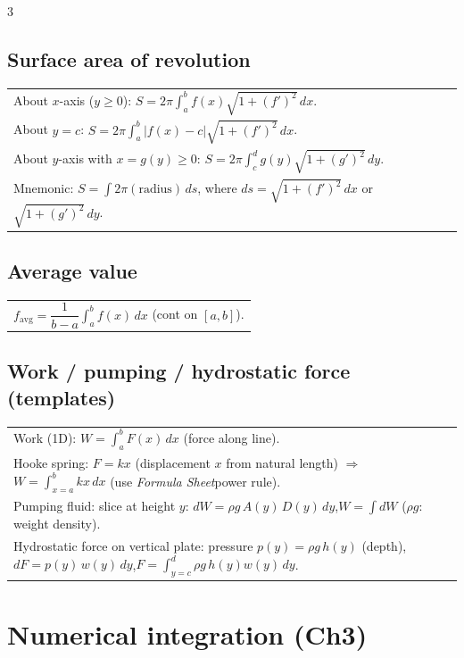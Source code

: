 \documentclass[10pt]{article}
\newcommand{\FS}{\textit{Formula Sheet}}
\begin{document}
\begin{multicols}{3}
\subsection*{Surface area of revolution}
\vspace{-1pt}
\begin{tabular}{@{}p{}@{}}
About $x$-axis ($y\ge 0$): $\displaystyle S=2\pi\int_a^b f(x)\sqrt{1+(f')^2}\,dx$.\\
About $y=c$: $\displaystyle S=2\pi\int_a^b |f(x)-c|\sqrt{1+(f')^2}\,dx$.\\
About $y$-axis with $x=g(y)\ge 0$: $\displaystyle S=2\pi\int_c^d g(y)\sqrt{1+(g')^2}\,dy$.\\
Mnemonic: $S=\int 2\pi(\text{radius})\,ds$, where $ds=\sqrt{1+(f')^2}\,dx$ or $\sqrt{1+(g')^2}\,dy$.\\
\end{tabular}

\subsection*{Average value}
\vspace{-1pt}
\begin{tabular}{@{}p{}@{}}
$f_{\text{avg}}=\dfrac{1}{b-a}\int_a^b f(x)\,dx$ (cont on $[a,b]$).\\
\end{tabular}

\subsection*{Work / pumping / hydrostatic force (templates)}
\vspace{-1pt}
\begin{tabular}{@{}p{}@{}}
Work (1D): $W=\int_a^b F(x)\,dx$ (force along line).\\
Hooke spring: $F=kx$ (displacement $x$ from natural length) $\Rightarrow$ $W=\int_{x=a}^{b}kx\,dx$ (use \FS power rule).\\
Pumping fluid: slice at height $y$: $dW=\rho g\,A(y)\,D(y)\,dy$,\quad $W=\int dW$ (\(\rho g\): weight density).\\
Hydrostatic force on vertical plate: pressure $p(y)=\rho g\,h(y)$ (depth),\quad $dF=p(y)\,w(y)\,dy$,\quad $F=\int_{y=c}^{d}\rho g\,h(y)w(y)\,dy$.\\
\end{tabular}

\section*{Numerical integration (Ch3)}

\end{multicols}
\end{document}
